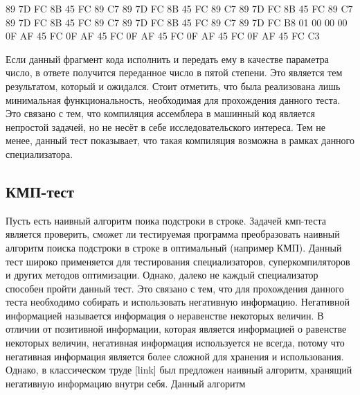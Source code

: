 \documentclass{spbau-diploma}
\begin{document}
89 7D FC 8B 45 FC 89 C7 89 7D FC 8B 45 FC 89 C7 89 7D FC 8B 45 FC 89 C7 89 7D FC 8B 45 FC 89 C7 89 7D FC 8B 45 FC 89 C7 89 7D FC B8 01 00 00 00 0F AF 45 FC 0F AF 45 FC 0F AF 45 FC 0F AF 45 FC 0F AF 45 FC C3

Если данный фрагмент кода исполнить и передать ему в качестве параметра число, в ответе получится переданное число в пятой степени. Это является тем результатом, который и ожидался. Стоит отметить, что была реализована лишь минимальная функциональность, необходимая для прохождения данного теста. Это связано с тем, что компиляция ассемблера в машинный код является непростой задачей, но не несёт в себе исследовательского интереса. Тем не менее, данный тест показывает, что такая компиляция возможна в рамках данного специализатора.

\subsection{ КМП-тест}
Пусть есть наивный алгоритм поика подстроки в строке. Задачей кмп-теста является проверить, сможет ли тестируемая программа преобразовать наивный алгоритм поиска подстроки в строке в оптимальный (например КМП). Данный тест широко применяется для тестирования специализаторов, суперкомпиляторов и других методов оптимизации. Однако, далеко не каждый специализатор способен пройти данный тест. Это связано с тем, что для прохождения данного теста необходимо собирать и использовать негативную информацию. Негативной информацией называется информация о неравенстве некоторых величин. В отличии от позитивной информации, которая является информацией о равенстве некоторых величин, негативная информация используется не всегда, потому что негативная информация является более сложной для хранения и использования. Однако, в классическом труде [link] был предложен наивный алгоритм, хранящий негативную информацию внутри себя. Данный алгоритм 
\end{document}
